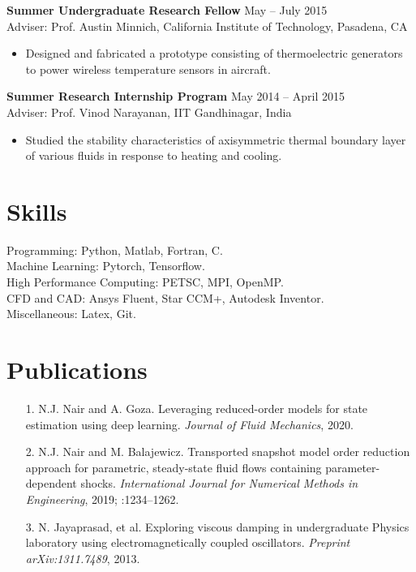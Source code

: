 \documentclass[margin]{res}
\begin{document}
\begin{resume}
{\bf Summer Undergraduate Research Fellow} \hfill May -- July 2015\\
Adviser: Prof. Austin Minnich, California Institute of Technology, Pasadena, CA
\begin{itemize}
\item Designed and fabricated a prototype consisting of thermoelectric generators to
power wireless temperature sensors in aircraft.
\end{itemize}

{\bf Summer Research Internship Program} \hfill   May 2014 -- April 2015\\
Adviser: Prof. Vinod Narayanan, IIT Gandhinagar, India
\begin{itemize}
\item Studied the stability characteristics of axisymmetric thermal boundary layer of various fluids in response to heating and cooling.
\end{itemize}


\section{\large Skills}		 
Programming: Python, Matlab, Fortran, C.\\
Machine Learning: Pytorch, Tensorflow.\\
High Performance Computing: PETSC, MPI, OpenMP.\\
CFD and CAD: Ansys Fluent, Star CCM+, Autodesk Inventor.\\ 
Miscellaneous: Latex, Git.

\section{\large Publications}
 \begin{itemize}
 \item[1.] N.J. Nair and A. Goza. Leveraging reduced-order models for state estimation using deep learning. \textit{Journal of Fluid Mechanics}, 2020.
 
 \item[2.] N.J. Nair and M. Balajewicz. Transported snapshot model order reduction approach for parametric, steady-state fluid flows containing parameter-dependent shocks. \textit{International Journal for Numerical Methods in Engineering}, 2019; :1234–1262.
 
  \item[3.] N. Jayaprasad, et al. Exploring viscous damping in undergraduate Physics laboratory using electromagnetically coupled oscillators. \textit{Preprint arXiv:1311.7489}, 2013.
 \end{itemize}
 

\end{resume}
\end{document}
